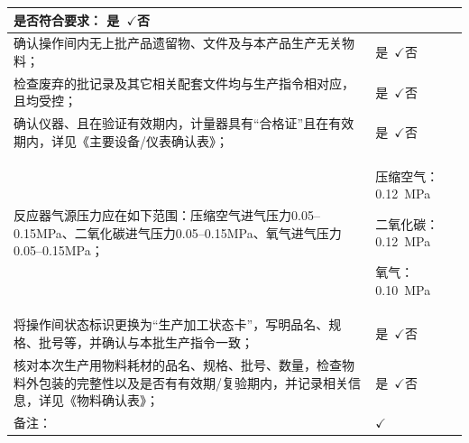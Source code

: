\documentclass[UTF8,10pt,a4paper,fontset=fandol]{ctexart}
\newcommand{\fieldvalue}[1]{#1}
\newcommand{\handwritten}[1]{#1}
\let\mathcheckmark\checkmark
\renewcommand{\checkmark}{\ensuremath{\mathcheckmark}}
\begin{document}
\begin{tabularx}{\textwidth}{|>{\raggedright\arraybackslash}p{}|>{\raggedright\arraybackslash}X|}
\vspace{2pt}
是否符合要求：
是\ \fieldvalue{\handwritten{\checkmark}}\quad 否 \\
\hline
确认操作间内无上批产品遗留物、文件及与本产品生产无关物料； &
是\ \fieldvalue{\handwritten{\checkmark}}\quad 否 \\
\hline
检查废弃的批记录及其它相关配套文件均与生产指令相对应，且均受控； &
是\ \fieldvalue{\handwritten{\checkmark}}\quad 否 \\
\hline
确认仪器、且在验证有效期内，计量器具有“合格证”且在有效期内，详见《主要设备/仪表确认表》； &
是\ \fieldvalue{\handwritten{\checkmark}}\quad 否 \\
\hline
反应器气源压力应在如下范围：压缩空气进气压力0.05--0.15MPa、二氧化碳进气压力0.05--0.15MPa、氧气进气压力0.05--0.15MPa； &
压缩空气：
\fieldvalue{\handwritten{0.12}}\ MPa

二氧化碳：
\fieldvalue{\handwritten{0.12}}\ MPa

氧气：
\fieldvalue{\handwritten{0.10}}\ MPa \\
\hline
将操作间状态标识更换为“生产加工状态卡”，写明品名、规格、批号等，并确认与本批生产指令一致； &
是\ \fieldvalue{\handwritten{\checkmark}}\quad 否 \\
\hline
核对本次生产用物料耗材的品名、规格、批号、数量，检查物料外包装的完整性以及是否有有效期/复验期内，并记录相关信息，详见《物料确认表》； &
是\ \fieldvalue{\handwritten{\checkmark}}\quad 否 \\
\hline
备注： &
\handwritten{\checkmark} \\
\hline
\end{tabularx}

\vspace{0.5em}
\end{document}
